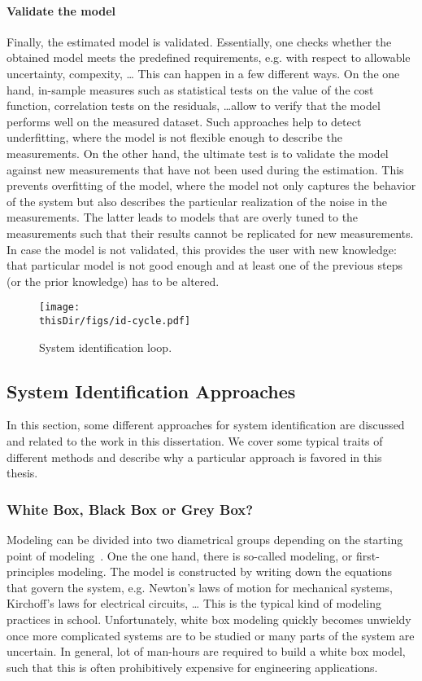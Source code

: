 \paragraph{Validate the model}
Finally, the estimated model is validated.
Essentially, one checks whether the obtained model meets the predefined requirements, e.g. with respect to allowable uncertainty, compexity, \ldots
This can happen in a few different ways.
On the one hand, in-sample measures such as statistical tests on the value of the cost function, correlation tests on the residuals, \ldots allow to verify that the model performs well on the measured dataset.
Such approaches help to detect underfitting, where the model is not flexible enough to describe the measurements.
On the other hand, the ultimate test is to validate the model against new measurements that have not been used during the estimation.
This prevents overfitting of the model, where the model not only captures the behavior of the system but also describes the particular realization of the noise in the measurements.
The latter leads to models that are overly tuned to the measurements such that their results cannot be replicated for new measurements.
In case the model is not validated, this provides the user with new knowledge: that particular model is not good enough and at least one of the previous steps (or the prior knowledge) has to be altered.


\begin{figure}
  \centering
  \texttt{[image: \\thisDir/figs/id-cycle.pdf]}
  \caption[System identification loop]{System identification loop. }
  \label{fig:intro:identification-cycle}
\end{figure}

\subsection{System Identification Approaches}
In this section, some different approaches for system identification are discussed and related to the work in this dissertation.
We cover some typical traits of different methods and describe why a particular approach is favored in this thesis.

\subsubsection{White Box, Black Box or Grey Box?}
Modeling can be divided into two diametrical groups depending on the starting point of modeling~\citep{Ljung2010}.
One the one hand, there is so-called  modeling, or first-principles modeling.
The model is constructed by writing down the equations that govern the system, e.g. Newton's laws of motion for mechanical systems, Kirchoff's laws for electrical circuits, \ldots
This is the typical kind of modeling practices in school.
Unfortunately, white box modeling quickly becomes unwieldy once more complicated systems are to be studied or many parts of the system are uncertain.
In general, lot of man-hours are required to build a white box model, such that this is often prohibitively expensive for engineering applications.

